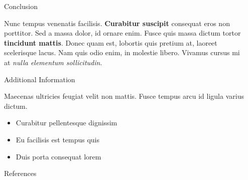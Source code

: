 \documentclass[final]{beamer}
\newlength{\sepwid}
\newlength{\onecolwid}
\begin{document}
\begin{frame}[t]
\begin{columns}[t]
\begin{column}{\sepwid}
\end{column} %

\begin{column}{\onecolwid} %


\begin{block}{Conclusion}

Nunc tempus venenatis facilisis. \textbf{Curabitur suscipit} consequat eros non porttitor. Sed a massa dolor, id ornare enim. Fusce quis massa dictum tortor \textbf{tincidunt mattis}. Donec quam est, lobortis quis pretium at, laoreet scelerisque lacus. Nam quis odio enim, in molestie libero. Vivamus cursus mi at \textit{nulla elementum sollicitudin}.

\end{block}


\begin{block}{Additional Information}

Maecenas ultricies feugiat velit non mattis. Fusce tempus arcu id ligula varius dictum. 
\begin{itemize}
\item Curabitur pellentesque dignissim
\item Eu facilisis est tempus quis
\item Duis porta consequat lorem
\end{itemize}

\end{block}


\begin{block}{References}

\nocite{*} %
\small{
\vspace{0.75in}}


\end{block}
\end{column}
\end{columns}
\end{frame}
\end{document}
